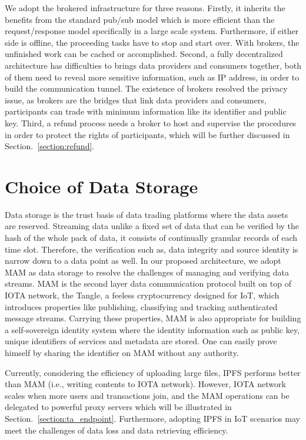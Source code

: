\begin{spacing}{2.0}
We adopt the brokered infrastructure for three reasons. Firstly, it inherits the benefits from the standard pub/sub model which is more efficient than the request/response model specifically in a large scale system. Furthermore, if either side is offline, the proceeding tasks have to stop and start over. With brokers, the unfinished work can be cached or accomplished. Second, a fully decentralized architecture has difficulties to brings data providers and consumers together, both of them need to reveal more sensitive information, such as IP address, in order to build the communication tunnel. The existence of brokers resolved the privacy issue, as brokers are the bridges that link data providers and consumers, participants can trade with minimum information like its identifier and public key. Third, a refund process needs a broker to host and supervise the procedures in order to protect the rights of participants, which will be further discussed in Section.~\ref{section:refund}.

\section{Choice of Data Storage}
Data storage is the trust basis of data trading platforms where the data assets are reserved. Streaming data unlike a fixed set of data that can be verified by the hash of the whole pack of data, it consists of continually granular records of each time slot. Therefore, the verification such as, data integrity and source identity is narrow down to a data point as well. In our proposed architecture, we adopt MAM as data storage to resolve the challenges of managing and verifying data streams. MAM is the second layer data communication protocol built on top of IOTA\cite{IOTAwhitepaper} network, the Tangle, a feeless cryptocurrency designed for IoT, which introduces properties like publishing, classifying and tracking authenticated message streams. Carrying these properties, MAM is also appropriate for building a self-sovereign identity system where the identity information such as public key, unique identifiers of services and metadata are stored. One can easily prove himself by sharing the identifier on MAM without any authority.

Currently, considering the efficiency of uploading large files, IPFS performs better than MAM (i.e., writing contents to IOTA network). However, IOTA network scales when more users and transactions join, and the MAM operations can be delegated to powerful proxy servers which will be illustrated in Section.~\ref{section:ta_endpoint}. Furthermore, adopting IPFS in IoT scenarios may meet the challenges of data loss and data retrieving efficiency.


\end{spacing}

